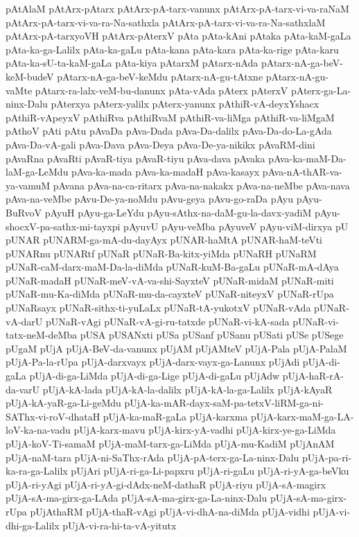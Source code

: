 {pAtAlaM
pAtArx-pAtarx
pAtArx-pA-tarx-vanunx
pAtArx-pA-tarx-vi-va-raNaM
pAtArx-pA-tarx-vi-va-ra-Na-sathxla
pAtArx-pA-tarx-vi-va-ra-Na-sathxlaM
pAtArx-pA-tarxyoVH
pAtArx-pAterxV
pAta
pAta-kAni
pAtaka
pAta-kaM-gaLa
pAta-ka-ga-Lalilx
pAta-ka-gaLu
pAta-kana
pAta-kara
pAta-ka-rige
pAta-karu
pAta-ka-sU-ta-kaM-gaLa
pAta-kiya
pAtarxM
pAtarx-nAda
pAtarx-nA-ga-beV-keM-budeV
pAtarx-nA-ga-beV-keMdu
pAtarx-nA-gu-tAtxne
pAtarx-nA-gu-vaMte
pAtarx-ra-lalx-veM-bu-danunx
pAta-vAda
pAterx
pAterxV
pAterx-ga-La-ninx-Dalu
pAterxya
pAterx-yalilx
pAterx-yanunx
pAthiR-vA-deyxYshacx
pAthiR-vApeyxV
pAthiRva
pAthiRvaM
pAthiR-va-liMga
pAthiR-va-liMgaM
pAthoV
pAti
pAtu
pAvaDa
pAva-Dada
pAva-Da-dalilx
pAva-Da-do-La-gAda
pAva-Da-vA-gali
pAva-Dava
pAva-Deya
pAva-De-ya-nikikx
pAvaRM-dini
pAvaRna
pAvaRti
pAvaR-tiya
pAvaR-tiyu
pAva-dava
pAvaka
pAva-ka-maM-Da-laM-ga-LeMdu
pAva-ka-mada
pAva-ka-madaH
pAva-kasayx
pAva-nA-thAR-va-ya-vamuM
pAvana
pAva-na-ca-ritarx
pAva-na-nakakx
pAva-na-neMbe
pAva-nava
pAva-na-veMbe
pAvu-De-ya-noMdu
pAvu-geya
pAvu-go-raDa
pAyu
pAyu-BuRvoV
pAyuH
pAyu-ga-LeYdu
pAyu-sAthx-na-daM-gu-la-davx-yadiM
pAyu-shocxV-pa-sathx-mi-tayxpi
pAyuvU
pAyu-veMba
pAyuveV
pAyu-viM-dirxya
pU
pUNAR
pUNARM-ga-mA-du-dayAyx
pUNAR-haMtA
pUNAR-haM-teVti
pUNARnu
pUNARtf
pUNaR
pUNaR-Ba-kitx-yiMda
pUNaRH
pUNaRM
pUNaR-caM-darx-maM-Da-la-diMda
pUNaR-kuM-Ba-gaLu
pUNaR-mA-dAya
pUNaR-madaH
pUNaR-meV-vA-va-shi-SayxteV
pUNaR-midaM
pUNaR-miti
pUNaR-mu-Ka-diMda
pUNaR-mu-da-cayxteV
pUNaR-niteyxV
pUNaR-rUpa
pUNaRsayx
pUNaR-sithx-ti-yuLaLx
pUNaR-tA-yukotxV
pUNaR-vAda
pUNaR-vA-darU
pUNaR-vAgi
pUNaR-vA-gi-ru-tatxde
pUNaR-vi-kA-sada
pUNaR-vi-tatx-neM-deMba
pUSA
pUSANxti
pUSa
pUSanf
pUSanu
pUSati
pUSe
pUSege
pUgaM
pUjA
pUjA-BeV-da-vanunx
pUjAM
pUjAMteV
pUjA-Pala
pUjA-PalaM
pUjA-Pa-la-rUpa
pUjA-darxvayx
pUjA-darx-vayx-ga-Lanunx
pUjAdi
pUjA-di-gaLa
pUjA-di-ga-LiMda
pUjA-di-ga-Lige
pUjA-di-gaLu
pUjAdw
pUjA-haR-rA-da-varU
pUjA-kA-lada
pUjA-kA-la-dalilx
pUjA-kA-la-ga-Lalilx
pUjA-kAyaR
pUjA-kA-yaR-ga-Li-geMdu
pUjA-ka-mAR-dayx-saM-pa-tetxV-liRM-ga-ni-SAThx-vi-roV-dhataH
pUjA-ka-maR-gaLa
pUjA-karxma
pUjA-karx-maM-ga-LA-loV-ka-na-vadu
pUjA-karx-mavu
pUjA-kirx-yA-vadhi
pUjA-kirx-ye-ga-LiMda
pUjA-koV-Ti-samaM
pUjA-maM-tarx-ga-LiMda
pUjA-mu-KadiM
pUjAnAM
pUjA-naM-tara
pUjA-ni-SaThx-rAda
pUjA-pA-terx-ga-La-ninx-Dalu
pUjA-pa-ri-ka-ra-ga-Lalilx
pUjAri
pUjA-ri-ga-Li-papxru
pUjA-ri-gaLu
pUjA-ri-yA-ga-beVku
pUjA-ri-yAgi
pUjA-ri-yA-gi-dAdx-neM-dathaR
pUjA-riyu
pUjA-sA-magirx
pUjA-sA-ma-girx-ga-LAda
pUjA-sA-ma-girx-ga-La-ninx-Dalu
pUjA-sA-ma-girx-rUpa
pUjAthaRM
pUjA-thaR-vAgi
pUjA-vi-dhA-na-diMda
pUjA-vidhi
pUjA-vi-dhi-ga-Lalilx
pUjA-vi-ra-hi-ta-vA-yitutx
}

